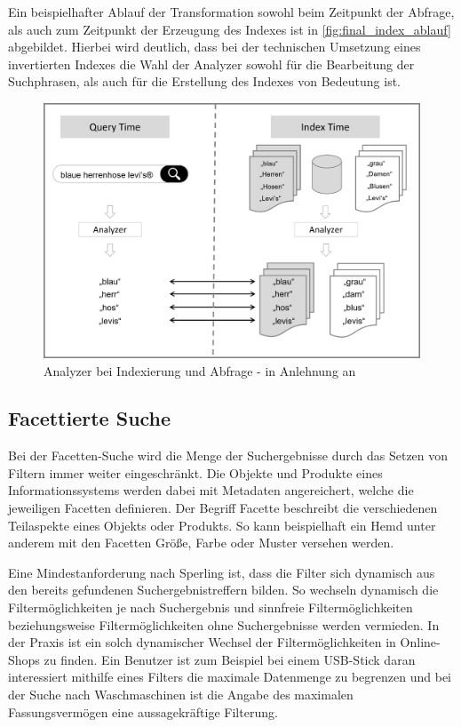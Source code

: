 Ein beispielhafter Ablauf der Transformation sowohl beim Zeitpunkt der Abfrage, als auch zum Zeitpunkt der Erzeugung des Indexes ist in \autoref{fig:final_index_ablauf} abgebildet. Hierbei wird deutlich, dass bei der technischen Umsetzung eines invertierten Indexes die Wahl der Analyzer sowohl für die Bearbeitung der Suchphrasen, als auch für die Erstellung des Indexes von Bedeutung ist.

\begin{figure}[H]
    \centering
    \includegraphics[width=0.7\linewidth]{images/Query_Index_Time.png}
    \caption{Analyzer bei Indexierung und Abfrage - in Anlehnung an \cite{SebastianRuss.2017}}
    \label{fig:final_index_ablauf}
\end{figure}

\subsection{Facettierte Suche\label{subsec2.1.3:Unterunterpunkt-3}}

Bei der Facetten-Suche wird die Menge der Suchergebnisse durch das Setzen von Filtern immer weiter eingeschränkt. Die Objekte und Produkte eines Informationssystems werden dabei mit Metadaten angereichert, welche die jeweiligen Facetten definieren. Der Begriff Facette beschreibt die verschiedenen Teilaspekte eines Objekts oder Produkts. So kann beispielhaft ein \glqq Hemd\grqq{} unter anderem mit den Facetten \glqq Größe\grqq{}, \glqq Farbe\grqq{} oder \glqq Muster\grqq{} versehen werden.

Eine Mindestanforderung nach Sperling \cite{Martin.2018} ist, dass die Filter sich dynamisch aus den bereits gefundenen Suchergebnistreffern bilden. So wechseln dynamisch die Filtermöglichkeiten je nach Suchergebnis und sinnfreie Filtermöglichkeiten beziehungsweise Filtermöglichkeiten ohne Suchergebnisse werden vermieden. In der Praxis ist ein solch dynamischer Wechsel der Filtermöglichkeiten in Online-Shops zu finden. Ein Benutzer ist zum Beispiel bei einem USB-Stick daran interessiert mithilfe eines Filters die maximale Datenmenge zu begrenzen und bei der Suche nach Waschmaschinen ist die Angabe des maximalen Fassungsvermögen eine aussagekräftige Filterung.

